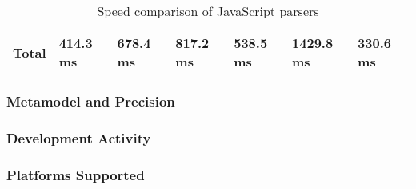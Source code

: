 \begin{table}[!htb]
\begin{tabular}{@{}lllllll@{}}
\textbf{Total}                                                & \textbf{414.3 ms}                                                & \textbf{678.4 ms}                                       & \textbf{817.2 ms}                                       & \textbf{538.5 ms}                                              & \textbf{1429.8 ms}                                      & \textbf{330.6 ms}                                                          \\ \bottomrule
\end{tabular}

\caption{Speed comparison of JavaScript parsers}
\label{table:speed-comparison-of-parsers}
\end{table}

\subsubsection{Metamodel and Precision}
\subsubsection{Development Activity}
\subsubsection{Platforms Supported}
